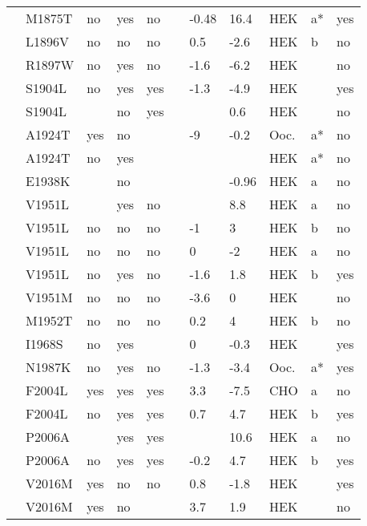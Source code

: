 \begin{tiny}
\begin{longtable}{p{4cm}|l|llll|ll|lll}
\citet{Makiyama2008MutationDB} & M1875T & no & yes & no &  & -0.48 & 16.4 & HEK & a* & yes \\
\citet{Beyder2014MutationDB} & L1896V & no & no & no &  & 0.5 & -2.6 & HEK & b & no \\
\citet{Olesen2012MutationDB} & R1897W & no & yes & no &  & -1.6 & -6.2 & HEK &  & no \\
\citet{Bankston2007aMutationDB} & S1904L & no & yes & yes &  & -1.3 & -4.9 & HEK &  & yes \\
\citet{Glaaser2012MutationDB} & S1904L &  & no & yes &  &  & 0.6 & HEK &  & no \\
\citet{Rook1999MutationDB} & A1924T & yes & no &  &  & -9 & -0.2 & Ooc. & a* & no \\
\citet{Tan2002MutationDB} & A1924T & no & yes &  &  &  &  & HEK & a* & no \\
\citet{Hoshi2014MutationDB} & E1938K &  & no &  &  &  & -0.96 & HEK & a & no \\
\citet{Shinlapawittayatorn2011bMutationDB} & V1951L &  & yes & no &  &  & 8.8 & HEK & a & no \\
\citet{Tan2005MutationDB} & V1951L & no & no & no &  & -1 & 3 & HEK & b & no \\
\citet{Tan2005MutationDB} & V1951L & no & no & no &  & 0 & -2 & HEK & a & no \\
\citet{Wang2007aMutationDB} & V1951L & no & yes & no &  & -1.6 & 1.8 & HEK & b & yes \\
\citet{Olesen2012MutationDB} & V1951M & no & no & no &  & -3.6 & 0 & HEK &  & no \\
\citet{Beyder2014MutationDB} & M1952T & no & no & no &  & 0.2 & 4 & HEK & b & no \\
\citet{Frustaci2005MutationDB} & I1968S & no & yes &  &  & 0 & -0.3 & HEK &  & yes \\
\citet{Ellinor2008MutationDB} & N1987K & no & yes & no &  & -1.3 & -3.4 & Ooc. & a* & yes \\
\citet{Bebarova2008MutationDB} & F2004L & yes & yes & yes &  & 3.3 & -7.5 & CHO & a & no \\
\citet{Wang2007aMutationDB} & F2004L & no & yes & yes &  & 0.7 & 4.7 & HEK & b & yes \\
\citet{Shinlapawittayatorn2011bMutationDB} & P2006A &  & yes & yes &  &  & 10.6 & HEK & a & no \\
\citet{Wang2007aMutationDB} & P2006A & no & yes & yes &  & -0.2 & 4.7 & HEK & b & yes \\
\citet{Chen2016MutationDB} & V2016M & yes & no & no &  & 0.8 & -1.8 & HEK &  & yes \\
\citet{Shy2014MutationDB} & V2016M & yes & no &  &  & 3.7 & 1.9 & HEK &  & no \\
\end{longtable}
\end{tiny}
